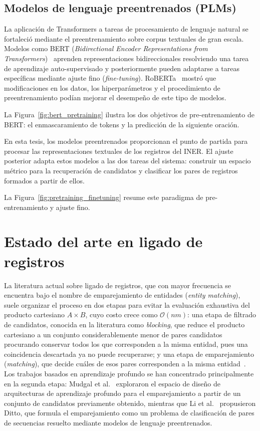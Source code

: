 \subsection{Modelos de lenguaje preentrenados (PLMs)}
La aplicación de Transformers a tareas de procesamiento de lenguaje natural se fortaleció mediante el preentrenamiento sobre corpus textuales de gran escala. Modelos como BERT (\textit{Bidirectional Encoder Representations from Transformers})~\cite{devlin2019} aprenden representaciones bidireccionales resolviendo una tarea de aprendizaje auto-supervisado y posteriormente pueden adaptarse a tareas específicas mediante ajuste fino (\textit{fine-tuning}). RoBERTa~\cite{liu2019} mostró que modificaciones en los datos, los hiperparámetros y el procedimiento de preentrenamiento podían mejorar el desempeño de este tipo de modelos.

La Figura~\ref{fig:bert_pretraining} ilustra los dos objetivos de pre-entrenamiento de BERT: el enmascaramiento de tokens y la predicción de la siguiente oración.


En esta tesis, los modelos preentrenados proporcionan el punto de partida para procesar las representaciones textuales de los registros del INER. El ajuste posterior adapta estos modelos a las dos tareas del sistema: construir un espacio métrico para la recuperación de candidatos y clasificar los pares de registros formados a partir de ellos.

La Figura~\ref{fig:pretraining_finetuning} resume este paradigma de pre-entrenamiento y ajuste fino.




\section{Estado del arte en ligado de registros}
\label{sec:estado_arte}

La literatura actual sobre ligado de registros, que con mayor frecuencia se encuentra bajo el nombre de emparejamiento de entidades (\textit{entity matching}), suele organizar el proceso en dos etapas para evitar la evaluación exhaustiva del producto cartesiano $A\times B$, cuyo costo crece como $\mathcal{O}(nm)$: una etapa de filtrado de candidatos, conocida en la literatura como \textit{blocking}, que reduce el producto cartesiano a un conjunto considerablemente menor de pares candidatos procurando conservar todos los que corresponden a la misma entidad, pues una coincidencia descartada ya no puede recuperarse; y una etapa de emparejamiento (\textit{matching}), que decide cuáles de esos pares corresponden a la misma entidad~\cite{mudgal2018,li2020}. Los trabajos basados en aprendizaje profundo se han concentrado principalmente en la segunda etapa: Mudgal et al.~\cite{mudgal2018} exploraron el espacio de diseño de arquitecturas de aprendizaje profundo para el emparejamiento a partir de un conjunto de candidatos previamente obtenido, mientras que Li et al.~\cite{li2020} propusieron Ditto, que formula el emparejamiento como un problema de clasificación de pares de secuencias resuelto mediante modelos de lenguaje preentrenados.


